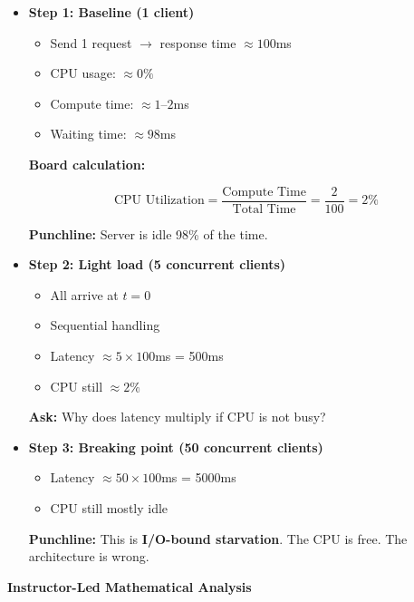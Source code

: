 \documentclass[11pt,a4paper]{article}
\begin{document}
\begin{itemize}[leftmargin=*]
	
	\item \textbf{Step 1: Baseline (1 client)}
	
	\begin{itemize}[leftmargin=*]
		\item Send 1 request $\rightarrow$ response time $\approx 100$ms
		\item CPU usage: $\approx 0\%$
		\item Compute time: $\approx 1$--$2$ms
		\item Waiting time: $\approx 98$ms
	\end{itemize}
	
	\textbf{Board calculation:}
	
	\[
	\text{CPU Utilization} = \frac{\text{Compute Time}}{\text{Total Time}}
	= \frac{2}{100} = 2\%
	\]
	
	\textbf{Punchline:}
	Server is idle 98\% of the time.
	
	\item \textbf{Step 2: Light load (5 concurrent clients)}
	
	\begin{itemize}[leftmargin=*]
		\item All arrive at $t=0$
		\item Sequential handling
		\item Latency $\approx 5 \times 100$ms = 500ms
		\item CPU still $\approx 2\%$
	\end{itemize}
	
	\textbf{Ask:}
	Why does latency multiply if CPU is not busy?
	
	\item \textbf{Step 3: Breaking point (50 concurrent clients)}
	
	\begin{itemize}[leftmargin=*]
		\item Latency $\approx 50 \times 100$ms = 5000ms
		\item CPU still mostly idle
	\end{itemize}
	
	\textbf{Punchline:}
	This is \textbf{I/O-bound starvation}.
	The CPU is free. The architecture is wrong.
	
\end{itemize}

\textbf{Instructor-Led Mathematical Analysis}
\end{document}
